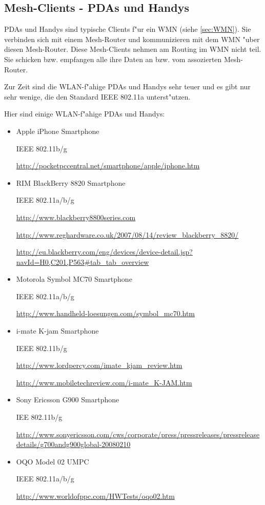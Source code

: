 \clearpage
\subsection{Mesh-Clients - PDAs und Handys}

PDAs und Handys sind typische Clients f"ur ein WMN (siehe \ref{sec:WMN}).
Sie verbinden sich mit einem Mesh-Router und kommunizieren mit dem WMN
"uber diesen Mesh-Router.  Diese Mesh-Clients nehmen am Routing im WMN
nicht teil. Sie schicken bzw. empfangen alle ihre Daten an bzw. vom
assozierten Mesh-Router.

Zur Zeit sind die WLAN-f"ahige PDAs und Handys sehr teuer und
es gibt nur sehr wenige, die den Standard IEEE 802.11a unterst"utzen.

Hier sind einige WLAN-f"ahige PDAs und Handys:

\begin{itemize}	

\item Apple iPhone Smartphone

IEEE 802.11b/g

\url{http://pocketpccentral.net/smartphone/apple/iphone.htm}

\item RIM BlackBerry 8820 Smartphone

IEEE 802.11a/b/g

\url{http://www.blackberry8800series.com}

\url{http://www.reghardware.co.uk/2007/08/14/review\_blackberry\_8820/}

\url{http://eu.blackberry.com/eng/devices/device-detail.jsp?navId=H0,C201,P563#tab\_tab\_overview}

\item Motorola Symbol MC70 Smartphone

IEEE 802.11a/b/g

\url{http://www.handheld-loesungen.com/symbol\_mc70.htm}

\item i-mate K-jam Smartphone

IEEE 802.11b/g

\url{http://www.lordpercy.com/imate\_kjam\_review.htm}

\url{http://www.mobiletechreview.com/i-mate\_K-JAM.htm}

\item Sony Ericsson G900 Smartphone

IEE 802.11b/g

\url{http://www.sonyericsson.com/cws/corporate/press/pressreleases/pressreleasedetails/g700andg900global-20080210}

\item OQO Model 02 UMPC

IEEE 802.11a/b/g

\url{http://www.worldofppc.com/HWTests/oqo02.htm}

\end{itemize}
